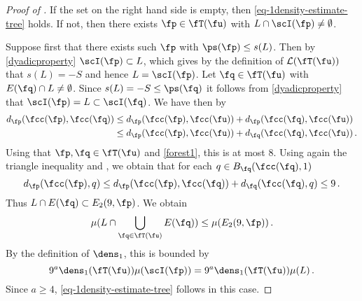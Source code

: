 \begin{proof}[Proof of ]
    If the set on the right hand side is empty, then \eqref{eq-1density-estimate-tree} holds. If not, then there exists $\fp \in \fT(\fu)$ with $L \cap \scI(\fp) \ne \emptyset$.

    Suppose first that there exists such $\fp$ with $\ps(\fp) \le s(L)$. Then by \eqref{dyadicproperty} $\scI(\fp) \subset L$, which gives by the definition of $\mathcal{L}(\fT(\fu))$ that $s(L) = -S$ and hence $L = \scI(\fp)$. Let $\fq \in \fT(\fu)$ with $E(\fq) \cap L \ne \emptyset$. Since $s(L) = -S \le \ps(\fq)$ it follows from \eqref{dyadicproperty} that $\scI(\fp) = L \subset \scI(\fq)$. We have then by 
    \begin{align*}
        d_{\fp}(\fcc(\fp), \fcc(\fq)) &\le d_{\fp}(\fcc(\fp), \fcc(\fu)) + d_{\fp}(\fcc(\fq), \fcc(\fu))\\
        &\le d_{\fp}(\fcc(\fp), \fcc(\fu)) + d_{\fq}(\fcc(\fq), \fcc(\fu))\,.
    \end{align*}
    Using that $\fp, \fq \in \fT(\fu)$ and \eqref{forest1}, this is at most $8$. Using again the triangle inequality and , we obtain that for each $q \in B_{\fq}(\fcc(\fq), 1)$
    $$
        d_{\fp}(\fcc(\fp), q) \le d_{\fp}(\fcc(\fp), \fcc(\fq)) + d_{\fq}(\fcc(\fq), q) \le 9\,.
    $$
    Thus $L \cap E(\fq) \subset E_2(9, \fp)$. We obtain
    $$
        \mu(L \cap \bigcup_{\fq \in \fT(\fu)} E(\fq)) \le \mu(E_2(9, \fp))\,.
    $$
    By the definition of $\dens_1$, this is bounded by
    $$
        9^a \dens_1(\fT(\fu)) \mu(\scI(\fp)) =9^a \dens_1(\fT(\fu)) \mu(L)\,.
    $$
    Since $a \ge 4$, \eqref{eq-1density-estimate-tree} follows in this case.


\end{proof}
